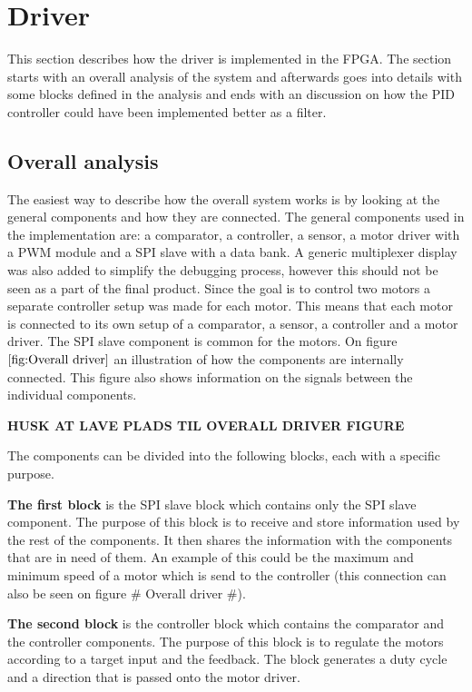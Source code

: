 \section{Driver}
This section describes how the driver is implemented in the FPGA. The section starts with an overall analysis of the system and afterwards goes into details with some blocks defined in the analysis and ends with an discussion on how the PID controller could have been implemented better as a filter.

\subsection{Overall analysis}

The easiest way to describe how the overall system works is by looking at the general components and how they are connected. The general components used in the implementation are: a comparator, a controller, a sensor, a motor driver with a PWM module and a SPI slave with a data bank. A generic multiplexer display was also added to simplify the debugging process, however this should not be seen as a part of the final product.
Since the goal is to control two motors a separate controller setup was made for each motor. This means that each motor is connected to its own setup of a comparator, a sensor, a controller and a motor driver. The SPI slave component is common for the motors.
On figure $\ref{fig:Overall driver}$ an illustration of how the components are internally connected. This figure also shows information on the signals between the individual components.


\textbf{HUSK AT LAVE PLADS TIL OVERALL DRIVER FIGURE}


The components can be divided into the following blocks, each with a specific purpose. 

\textbf{The first block} is the SPI slave block which contains only the SPI slave component. The purpose of this block is to receive and store information used by the rest of the components. It then shares the information with the components that are in need of them. An example of this could be the maximum and minimum speed of a motor which is send to the controller (this connection can also be seen on figure \# Overall driver \#).

\textbf{The second block} is the controller block which contains the comparator and the controller components. The purpose of this block is to regulate the motors according to a target input and the feedback. The block generates a duty cycle and a direction that is passed onto the motor driver.

